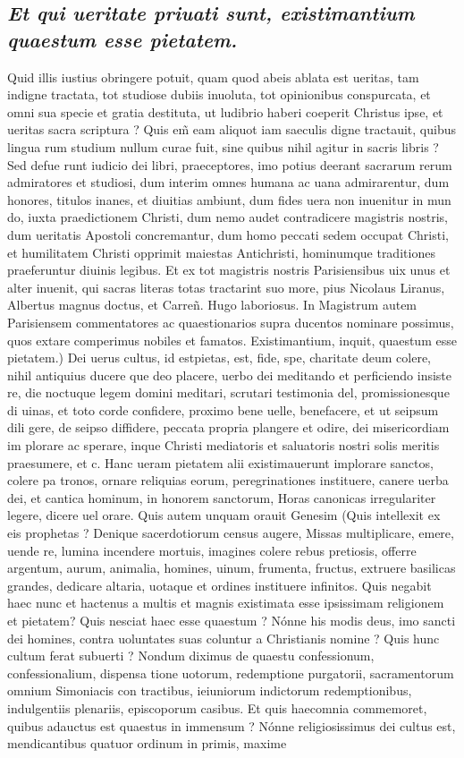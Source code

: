 \documentclass{article}
\begin{document}
\begin{pages}
\subsection*{\textit{Et qui ueritate priuati sunt, existimantium quaestum esse pietatem. }}\pstart Quid illis iustius obringere potuit, quam quod abeis ablata est ueritas, tam indigne tractata, tot studiose dubiis inuoluta, tot opinionibus conspurcata, et omni sua specie et gratia destituta, ut ludibrio haberi coeperit Christus ipse, et ueritas sacra scriptura ? Quis em̃ eam aliquot iam saeculis digne tractauit, quibus lingua rum studium nullum curae fuit, sine quibus nihil agitur in sacris libris ?Sed defue runt iudicio dei libri, praeceptores, imo potius deerant sacrarum rerum admiratores et studiosi, dum interim omnes humana ac uana admirarentur, dum honores, titulos inanes, et diuitias ambiunt, dum fides uera non inuenitur in mun do, iuxta praedictionem Christi, dum nemo audet contradicere magistris nostris, dum ueritatis Apostoli concremantur, dum homo peccati sedem occupat Christi, et humilitatem Christi opprimit maiestas Antichristi, hominumque traditiones praeferuntur diuinis legibus. Et ex tot magistris nostris Parisiensibus uix unus et alter inuenit, qui sacras literas totas tractarint suo more, pius Nicolaus Liranus, Albertus magnus doctus, et Carreñ. Hugo laboriosus. In Magistrum autem Parisiensem commentatores ac quaestionarios supra ducentos nominare possimus, quos extare comperimus nobiles et famatos. Existimantium, inquit, quaestum esse pietatem.) Dei uerus cultus, id estpietas, est, fide, spe, charitate deum colere, nihil antiquius ducere que deo placere, uerbo dei meditando et perficiendo insiste re, die noctuque legem domini meditari, scrutari testimonia del, promissionesque di uinas, et toto corde confidere, proximo bene uelle, benefacere, et ut seipsum dili gere, de seipso diffidere, peccata propria plangere et odire, dei misericordiam im plorare ac sperare, inque Christi mediatoris et saluatoris nostri solis meritis praesumere, et c. Hanc ueram pietatem alii existimauerunt implorare sanctos, colere pa tronos, ornare reliquias eorum, peregrinationes instituere, canere uerba dei, et cantica hominum, in honorem sanctorum, Horas canonicas irregulariter legere, dicere uel orare. Quis autem unquam orauit Genesim (Quis intellexit ex eis prophetas ? Denique sacerdotiorum census augere, Missas multiplicare, emere, uende re, lumina incendere mortuis, imagines colere rebus pretiosis, offerre argentum, aurum, animalia, homines, uinum, frumenta, fructus, extruere basilicas grandes, dedicare altaria, uotaque et ordines instituere infinitos. Quis negabit haec nunc et hactenus a multis et magnis existimata esse ipsissimam religionem et pietatem? Quis nesciat haec esse quaestum ? Nónne his modis deus, imo sancti dei homines, contra uoluntates suas coluntur a Christianis nomine ? Quis hunc cultum ferat subuerti ? Nondum diximus de quaestu confessionum, confessionalium, dispensa tione uotorum, redemptione purgatorii, sacramentorum omnium Simoniacis con tractibus, ieiuniorum indictorum redemptionibus, indulgentiis plenariis, episcoporum casibus. Et quis haecomnia commemoret, quibus adauctus est quaestus in immensum ? Nónne religiosissimus dei cultus est, mendicantibus quatuor ordinum in primis, maxime 
\end{pages}
\end{document}
